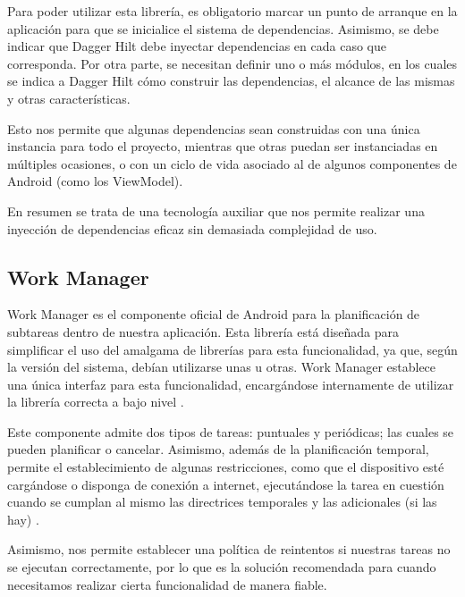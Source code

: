             Para poder utilizar esta librería, es obligatorio marcar un punto de arranque en la aplicación para que se
            inicialice el sistema de dependencias. Asimismo, se debe indicar que Dagger Hilt debe inyectar dependencias 
            en cada caso que corresponda. Por otra parte, se necesitan definir uno o más módulos, en los 
            cuales se indica a Dagger Hilt cómo construir las dependencias, el alcance de las mismas y otras
            características. 
            
            Esto nos permite que algunas dependencias sean construidas con una única instancia para
            todo el proyecto, mientras que otras puedan ser instanciadas en múltiples ocasiones, o con un ciclo de vida 
            asociado al de algunos componentes de Android (como los ViewModel).

            En resumen se trata de una tecnología auxiliar que nos permite realizar una inyección de dependencias
            eficaz sin demasiada complejidad de uso.

        \subsection{Work Manager}
            Work Manager es el componente oficial de Android para la planificación de subtareas dentro de nuestra 
            aplicación. Esta librería está diseñada para simplificar el uso del amalgama de librerías para esta
            funcionalidad, ya que, según la versión del sistema, debían utilizarse unas u otras. Work Manager establece
            una única interfaz para esta funcionalidad, encargándose internamente de utilizar la librería correcta a
            bajo nivel \cite{noauthor_workmanager_nodate}.
            
            Este componente admite dos tipos de tareas: puntuales y periódicas; las cuales se pueden planificar o 
            cancelar. Asimismo, además de la planificación temporal, permite el establecimiento de algunas restricciones,
            como que el dispositivo esté cargándose o disponga de conexión a internet, ejecutándose la tarea en cuestión
            cuando se cumplan al mismo las directrices temporales y las adicionales (si las hay) 
            \cite{noauthor_arquitectura_nodate}.

            Asimismo, nos permite establecer una política de reintentos si nuestras tareas no se ejecutan correctamente,
            por lo que es la solución recomendada para cuando necesitamos realizar cierta funcionalidad de manera fiable.
            
